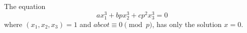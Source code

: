 \begin{proposition}\label{eq:040}
    The equation
\[
    ax_1^3+bpx_2^3+cp^2x_3^3=0
\]
    where $(x_1,x_2,x_3)=1$ and $abc
    ot\equiv0\pmod p$, has only the solution $x=0$.
\end{proposition}
